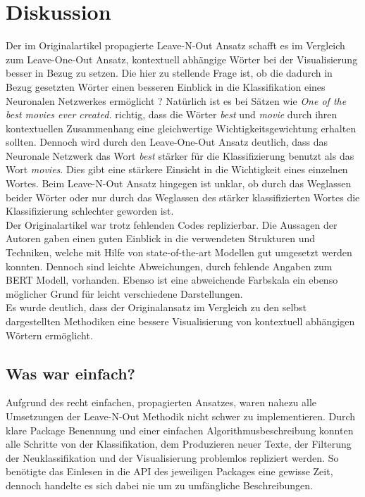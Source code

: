 \documentclass[DIV=13,fontsize=11pt]{scrartcl}
\begin{document}
\section{Diskussion}
Der im Originalartikel propagierte Leave-N-Out Ansatz schafft es im Vergleich zum Leave-One-Out Ansatz, kontextuell abhängige
Wörter bei der Visualisierung besser in Bezug zu setzen. Die hier zu stellende Frage ist, ob die dadurch in Bezug gesetzten Wörter einen besseren
Einblick in die Klassifikation eines Neuronalen Netzwerkes ermöglicht ? Natürlich ist es bei Sätzen wie \textit{One of the best movies ever created.} richtig,
dass die Wörter \textit{best} und \textit{movie} durch ihren kontextuellen Zusammenhang eine gleichwertige Wichtigkeitsgewichtung erhalten sollten.
Dennoch wird durch den Leave-One-Out Ansatz deutlich, dass das Neuronale Netzwerk das Wort \textit{best} stärker für die Klassifizierung benutzt
als das Wort \textit{movies}. Dies gibt eine stärkere Einsicht in die Wichtigkeit eines einzelnen Wortes. Beim Leave-N-Out Ansatz hingegen
ist unklar, ob durch das Weglassen beider Wörter  oder nur durch das Weglassen des stärker klassifizierten Wortes die Klassifizierung schlechter geworden ist.\\

Der Originalartikel war trotz fehlenden Codes replizierbar. Die Aussagen der Autoren gaben einen guten Einblick in die verwendeten Strukturen und Techniken,
welche mit Hilfe von state-of-the-art Modellen gut umgesetzt werden konnten. Dennoch sind leichte Abweichungen, durch fehlende Angaben zum
BERT Modell, vorhanden. Ebenso ist eine abweichende Farbskala ein ebenso möglicher Grund für leicht verschiedene Darstellungen.\\

Es wurde deutlich, dass der Originalansatz im Vergleich zu den selbst dargestellten Methodiken eine bessere Visualisierung von kontextuell
abhängigen Wörtern ermöglicht.

\subsection{Was war einfach?}
Aufgrund des recht einfachen, propagierten Ansatzes, waren nahezu alle Umsetzungen der Leave-N-Out Methodik nicht schwer zu implementieren.
Durch klare Package Benennung und einer einfachen Algorithmusbeschreibung konnten alle Schritte von der Klassifikation, dem Produzieren neuer Texte,
der Filterung der Neuklassifikation und der Visualisierung problemlos repliziert werden. So benötigte das Einlesen in die API des jeweiligen
Packages eine gewisse Zeit, dennoch handelte es sich dabei nie um zu umfängliche Beschreibungen.\\
\end{document}

